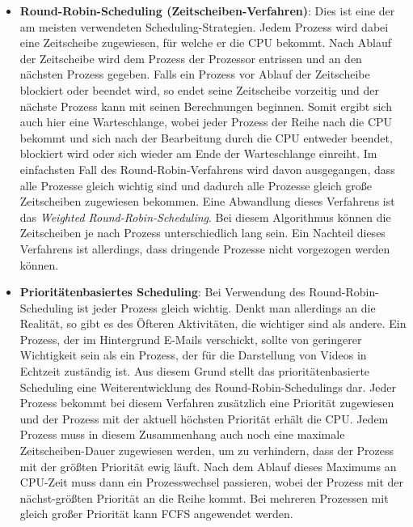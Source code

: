 \begin{description}
\begin{description}
								\begin{itemize}
									\item
										\textbf{Round-Robin-Scheduling (Zeitscheiben-Verfahren)}: Dies ist eine der am meisten verwendeten Scheduling-Strategien. Jedem Prozess wird dabei eine Zeitscheibe zugewiesen, für welche er die CPU bekommt. Nach Ablauf der Zeitscheibe wird dem Prozess der Prozessor entrissen und an den nächsten Prozess gegeben. Falls ein Prozess vor Ablauf der Zeitscheibe blockiert oder beendet wird, so endet seine Zeitscheibe vorzeitig und der nächste Prozess kann mit seinen Berechnungen beginnen. Somit ergibt sich auch hier eine Warteschlange, wobei jeder Prozess der Reihe nach die CPU bekommt und sich nach der Bearbeitung durch die CPU entweder beendet, blockiert wird oder sich wieder am Ende der Warteschlange einreiht. Im einfachsten Fall des Round-Robin-Verfahrens wird davon ausgegangen, dass alle Prozesse gleich wichtig sind und dadurch alle Prozesse gleich große Zeitscheiben zugewiesen bekommen. Eine Abwandlung dieses Verfahrens ist das \textit{Weighted Round-Robin-Scheduling}. Bei diesem Algorithmus können die Zeitscheiben je nach Prozess unterschiedlich lang sein. Ein Nachteil dieses Verfahrens ist allerdings, dass dringende Prozesse nicht vorgezogen werden können.
									\item
										\textbf{Prioritätenbasiertes Scheduling}: Bei Verwendung des Round-Robin-Scheduling ist jeder Prozess gleich wichtig. Denkt man allerdings an die Realität, so gibt es des Öfteren Aktivitäten, die wichtiger sind als andere. Ein Prozess, der im Hintergrund E-Mails verschickt, sollte von geringerer Wichtigkeit sein als ein Prozess, der für die Darstellung von Videos in Echtzeit zuständig ist. Aus diesem Grund stellt das prioritätenbasierte Scheduling eine Weiterentwicklung des Round-Robin-Schedulings dar. Jeder Prozess bekommt bei diesem Verfahren zusätzlich eine Priorität zugewiesen und der Prozess mit der aktuell höchsten Priorität erhält die CPU. Jedem Prozess muss in diesem Zusammenhang auch noch eine maximale Zeitscheiben-Dauer zugewiesen werden, um zu verhindern, dass der Prozess mit der größten Priorität ewig läuft. Nach dem Ablauf dieses Maximums an CPU-Zeit muss dann ein Prozesswechsel passieren, wobei der Prozess mit der nächst-größten Priorität an die Reihe kommt. Bei mehreren Prozessen mit gleich großer Priorität kann FCFS angewendet werden. \cite{ModerneBetriebssysteme}
								\end{itemize}
						\end{description}
				\end{description}
			
